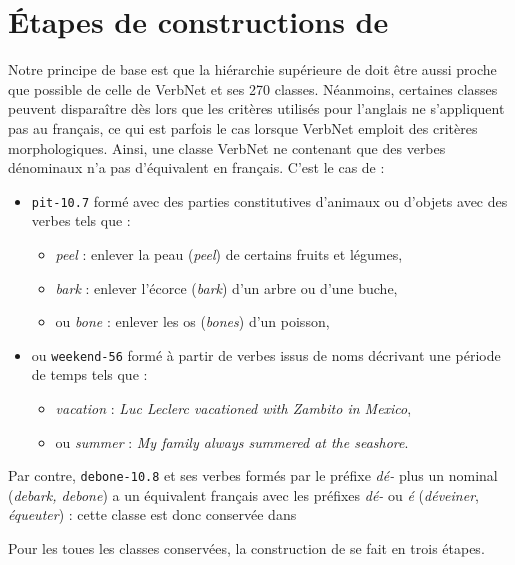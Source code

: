 \section{Étapes de constructions de \verbenet{}}

Notre principe de base est que la hiérarchie supérieure de \verbenet{} doit
être aussi proche que possible de celle de VerbNet et ses 270 classes.
Néanmoins, certaines classes peuvent disparaître dès lors que les critères
utilisés pour l'anglais ne s'appliquent pas au français, ce qui est parfois le
cas lorsque VerbNet emploit des critères morphologiques. Ainsi, une classe
VerbNet ne contenant que des verbes dénominaux n'a pas d'équivalent en
français. C'est le cas de :

\begin{itemize}
    \item {\color{blue}\texttt{pit-10.7}} formé avec des parties constitutives
        d'animaux ou d'objets avec des verbes tels que :
        \begin{itemize}
            \item \textit{peel} : enlever la peau (\textit{peel}) de certains fruits
                et légumes,
            \item \textit{bark} : enlever l'écorce (\textit{bark}) d'un arbre ou
                d'une buche,
            \item ou \textit{bone} : enlever les os (\textit{bones}) d'un poisson,
        \end{itemize}
    \item ou {\color{blue}\texttt{weekend-56}} formé à partir de verbes issus
        de noms décrivant une période de temps tels que :
        \begin{itemize}
            \item \textit{vacation} : \textit{Luc Leclerc vacationed with Zambito in
                Mexico},
            \item ou \textit{summer} : \textit{My family always summered at the seashore}.
        \end{itemize}
\end{itemize}

Par contre, {\color{blue}\texttt{debone-10.8}} et ses verbes formés par le
préfixe \textit{dé-} plus un nominal (\textit{debark, debone}) a un équivalent
français avec les préfixes \textit{dé-} ou \textit{é} (\textit{déveiner},
\textit{équeuter}) : cette classe est donc conservée dans \verbenet{}

Pour les toues les classes conservées, la construction de \verbenet{} se fait
en trois étapes.


